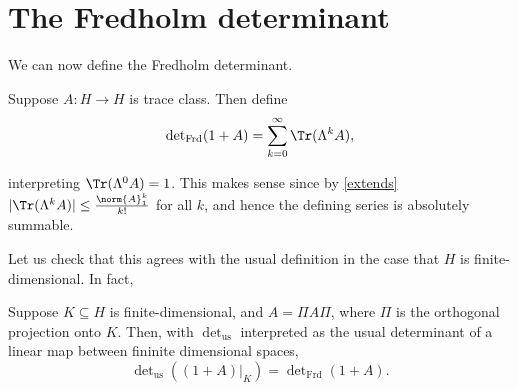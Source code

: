 \documentclass[12pt]{amsart}
\begin{document}
\section{The Fredholm determinant}
We can now define the Fredholm determinant.
\begin{defn}Suppose $A:H \to H$ is trace class. Then define
\[\det\nolimits_{\mathrm{Frd}}(1+A) = \sum_{k=0}^\infty \Tr(\Lambda^k A),\]\end{defn}
interpreting $\Tr(\Lambda^0 A) = 1$. This makes sense since by \cref{extends} $|\Tr(\Lambda^k A)| \leq \frac{\norm{A}_1^k}{k!}$ for all $k$, and hence the defining series is absolutely summable.

Let us check that this agrees with the usual definition in the case that $H$ is finite-dimensional. In fact,
\begin{prop}\label{findet}Suppose $K \subseteq H$ is finite-dimensional, and $A = \Pi A \Pi$, where $\Pi$ is the orthogonal projection onto $K$. Then, with $\det\nolimits_{\mathrm{us}}$ interpreted as the usual determinant of a linear map between fininite dimensional spaces,
\[\det\nolimits_{\mathrm{us}}((1+A)|_K) = \det\nolimits_{\mathrm{Frd}}(1+A).\]\end{prop}
\end{document}
